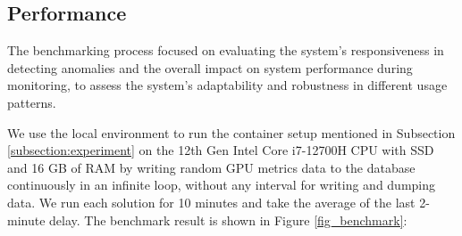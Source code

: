 \subsection{Performance}
\label{subsec:performance}
The benchmarking process focused on evaluating the system's responsiveness in detecting anomalies and the overall impact on system performance during monitoring, to assess the system's adaptability and robustness in different usage patterns.

We use the local environment to run the container setup mentioned in Subsection \ref{subsection:experiment} on the 12th Gen Intel Core i7-12700H CPU with SSD and 16 GB of RAM by writing random GPU metrics data to the database continuously in an infinite loop, without any interval for writing and dumping data. We run each solution for 10 minutes and take the average of the last 2-minute delay. The benchmark result is shown in Figure \ref{fig_benchmark}:






